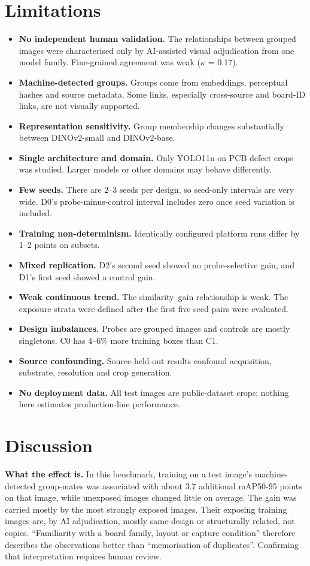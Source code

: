 \documentclass[11pt]{article}
\begin{document}
\section{Limitations}
\begin{itemize}
\item \textbf{No independent human validation.} The relationships between grouped images were characterised only by AI-assisted visual adjudication from one model family. Fine-grained agreement was weak ($\kappa$ = 0.17).
\item \textbf{Machine-detected groups.} Groups come from embeddings, perceptual hashes and source metadata. Some links, especially cross-source and board-ID links, are not visually supported.
\item \textbf{Representation sensitivity.} Group membership changes substantially between DINOv2-small and DINOv2-base.
\item \textbf{Single architecture and domain.} Only YOLO11n on PCB defect crops was studied. Larger models or other domains may behave differently.
\item \textbf{Few seeds.} There are 2--3 seeds per design, so seed-only intervals are very wide. D0's probe-minus-control interval includes zero once seed variation is included.
\item \textbf{Training non-determinism.} Identically configured platform runs differ by 1--2 points on subsets.
\item \textbf{Mixed replication.} D2's second seed showed no probe-selective gain, and D1's first seed showed a control gain.
\item \textbf{Weak continuous trend.} The similarity--gain relationship is weak. The exposure strata were defined after the first five seed pairs were evaluated.
\item \textbf{Design imbalances.} Probes are grouped images and controls are mostly singletons. C0 has 4--6\% more training boxes than C1.
\item \textbf{Source confounding.} Source-held-out results confound acquisition, substrate, resolution and crop generation.
\item \textbf{No deployment data.} All test images are public-dataset crops; nothing here estimates production-line performance.
\end{itemize}
\section{Discussion}
\textbf{What the effect is.} In this benchmark, training on a test image's machine-detected group-mates was associated with about 3.7 additional mAP50-95 points on that image, while unexposed images changed little on average. The gain was carried mostly by the most strongly exposed images. Their exposing training images are, by AI adjudication, mostly same-design or structurally related, not copies. ``Familiarity with a board family, layout or capture condition'' therefore describes the observations better than ``memorisation of duplicates''. Confirming that interpretation requires human review.
\end{document}
